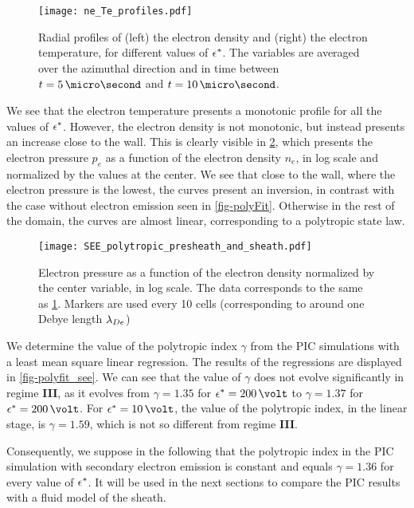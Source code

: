 \begin{figure}[hbtp]
  \centering
  \texttt{[image: ne\_Te\_profiles.pdf]}
  \caption{Radial profiles of (left) the electron density and (right) the electron temperature, for different values of $\epsilon^{*}$. The variables are averaged over the azimuthal direction and in time between $t=5\,\micro\second$ and $t=10\,\micro\second$.  }
  \label{fig-radial_profiles_see}
\end{figure}

We see that the electron temperature presents a monotonic profile for all the values of $\epsilon^{*}$.
However, the electron density is not monotonic, but instead presents an increase close to the wall.
This is clearly visible in \cref{fig-log_pe-ne}, which presents the electron pressure $p_e$ as a function of the electron density $n_e$, in log scale and normalized by the values at the center.
We see that close to the wall, where the electron pressure is the lowest, the curves present an inversion, in contrast with the case without electron emission seen in \cref{fig-polyFit}.
Otherwise in the rest of the domain, the curves are almost linear, corresponding to a polytropic state law.

\begin{figure}[hbtp]
  \centering
  \texttt{[image: SEE\_polytropic\_presheath\_and\_sheath.pdf]}
  \caption{Electron pressure as a function of the electron density normalized by the center variable, in log scale. The data corresponds to the same as \cref{fig-radial_profiles_see}. Markers are used every 10 cells (corresponding to around one Debye length $\lambda_{De}$)}
  \label{fig-log_pe-ne}
\end{figure}

We determine the value of the polytropic index $\gamma$ from the \ac{PIC} simulations with a least mean square linear regression.
The results of the regressions are displayed in \cref{fig-polyfit_see}.
We can see that the value of $\gamma$ does not evolve significantly in regime {\bf III}, as it evolves from $\gamma=1.35$ for $\crover=200\,\volt$ to $\gamma=1.37$ for $\crover=200\,\volt$.
For $\crover=10\,\volt$, the value of the polytropic index, in the linear stage, is $\gamma=1.59$, which is not so different from regime {\bf III}.

Consequently, we suppose in the following that the polytropic index in the \ac{PIC} simulation with secondary electron emission is constant and equals $\gamma=1.36$ for every value of $\epsilon^{*}$.
It will be used in the next sections to compare the \ac{PIC} results with a fluid model of the sheath.

